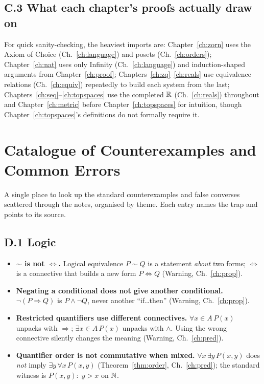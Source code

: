 \section*{C.3 What each chapter's proofs actually draw on}

For quick sanity-checking, the heaviest imports are: Chapter~\ref{ch:zorn} uses the Axiom of Choice (Ch.~\ref{ch:language}) and posets (Ch.~\ref{ch:orders}); Chapter~\ref{ch:nat} uses only Infinity (Ch.~\ref{ch:language}) and induction-shaped arguments from Chapter~\ref{ch:proof}; Chapters~\ref{ch:zq}--\ref{ch:reals} use equivalence relations (Ch.~\ref{ch:equiv}) repeatedly to build each system from the last; Chapters~\ref{ch:seq}--\ref{ch:topspaces} use the completed $\mathbb{R}$ (Ch.~\ref{ch:reals}) throughout and Chapter~\ref{ch:metric} before Chapter~\ref{ch:topspaces} for intuition, though Chapter~\ref{ch:topspaces}'s definitions do not formally require it.

\chapter{Catalogue of Counterexamples and Common Errors}\label{ch:counterexamples}

A single place to look up the standard counterexamples and false converses scattered through the notes, organised by theme. Each entry names the trap and points to its source.

\section*{D.1 Logic}

\begin{itemize}
	\item \textbf{$\sim$ is not $\Leftrightarrow$.} Logical equivalence $P\sim Q$ is a statement \emph{about} two forms; $\Leftrightarrow$ is a connective that builds a new form $P\Leftrightarrow Q$ (Warning, Ch.~\ref{ch:prop}).
	\item \textbf{Negating a conditional does not give another conditional.} $\neg(P\Rightarrow Q)$ is $P\wedge\neg Q$, never another ``if\ldots then'' (Warning, Ch.~\ref{ch:prop}).
	\item \textbf{Restricted quantifiers use different connectives.} $\forall x\in A\,P(x)$ unpacks with $\Rightarrow$; $\exists x\in A\,P(x)$ unpacks with $\wedge$. Using the wrong connective silently changes the meaning (Warning, Ch.~\ref{ch:pred}).
	\item \textbf{Quantifier order is not commutative when mixed.} $\forall x\,\exists y\,P(x,y)$ does \emph{not} imply $\exists y\,\forall x\,P(x,y)$ (Theorem~\ref{thm:order}, Ch.~\ref{ch:pred}); the standard witness is $P(x,y):\;y>x$ on $\mathbb{N}$.
\end{itemize}

